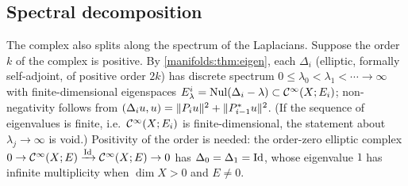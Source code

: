 \subsection{Spectral decomposition}
The complex also splits along the spectrum of the Laplacians. Suppose the order $k$
of the complex is positive. By
\cref{manifolds:thm:eigen}, each $\Delta_i$ (elliptic, formally self-adjoint, of positive
order $2k$) has discrete spectrum $0\le\lambda_0<\lambda_1<\cdots\to\infty$ with finite-dimensional
eigenspaces $E^i_\lambda=\operatorname{Nul}(\Delta_i-\lambda)\subset\mathcal{C}^\infty(X;E_i)$; non-negativity follows from
$( \Delta_iu, u)=\|P_iu\|^2+\|P_{i-1}^*u\|^2$. (If the sequence of eigenvalues is
finite, i.e.\ $\mathcal{C}^\infty(X;E_i)$ is finite-dimensional, the statement about $\lambda_j\to\infty$ is
void.) Positivity of the order is needed: the order-zero elliptic complex
$0\to\mathcal{C}^\infty(X;E)\xrightarrow{\operatorname{Id}}\mathcal{C}^\infty(X;E)\to0$ has $\Delta_0=\Delta_1=\operatorname{Id}$, whose eigenvalue
$1$ has infinite multiplicity when $\dim X>0$ and $E\ne0$.

